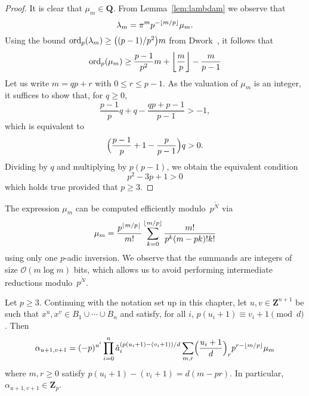 \begin{proof}
It is clear that $\mu_m \in \mathbf{Q}$.  From Lemma~\ref{lem:lambdam} 
we observe that 
\begin{equation*}
\lambda_m = \pi^m p^{- \left\lfloor m/p\right\rfloor} \mu_m.
\end{equation*}
Using the bound $\operatorname{ord}_p(\lambda_m) \geq \bigl((p-1)/p^2\bigr) m$ 
from Dwork~\citep[Pages~55--57]{Dwork62}, it follows that 
\begin{equation*}
\operatorname{ord}_p (\mu_m) \geq \frac{p-1}{p^2} m + \left\lfloor\frac{m}{p}\right\rfloor - \frac{m}{p-1}
\end{equation*}
Let us write $m = q p + r$ with $0 \leq r \leq p-1$.  As the valuation 
of $\mu_m$ is an integer, it suffices to show that, for $q \geq 0$, 
\begin{equation*}
\frac{p-1}{p} q + q - \frac{q p + p - 1}{p - 1} > -1,
\end{equation*}
which is equivalent to 
\begin{equation*}
\Bigl( \frac{p-1}{p} + 1 - \frac{p}{p - 1} \Bigr) q > 0.
\end{equation*}
Dividing by $q$ and multiplying by $p (p-1)$, we obtain the equivalent 
condition
\begin{equation*}
p^2 - 3p + 1 > 0
\end{equation*}
which holds true provided that $p \geq 3$.
\end{proof}

\begin{rem} \label{rem:01-03-mup}
The expression $\mu_m$ can be computed efficiently 
modulo~$p^{\tilde{N}}$ via
\begin{equation*}
\mu_m = \frac{p^{\left\lfloor m/p\right\rfloor}}{m!} 
    \sum_{k=0}^{\left\lfloor m/p\right\rfloor} \frac{m!}{p^k (m-pk)! k!}
\end{equation*}
using only one $p$-adic inversion.  We observe that the summands are 
integers of size $\mathcal{O}(m \log m)$ bits, which allows us to 
avoid performing intermediate reductions modulo~$p^{\tilde{N}}$.
\end{rem}

\begin{thm} \label{thm:alphap}
Let $p \geq 3$.  Continuing with the notation set up in this chapter, 
let $u, v \in \mathbf{Z}^{n+1}$ be such that 
$x^u, x^v \in B_1 \cup \dotsb \cup B_n$ and satisfy, 
for all $i$, $p (u_i + 1) \equiv v_i + 1 \pmod{d}$. 
Then 
\begin{equation} \label{eq:alphap.0}
\alpha_{u+1,v+1} = (-p)^{u'} \prod_{i=0}^n 
    \hat{a}_i^{(p (u_i + 1) - (v_i + 1))/d} \sum_{m,r} 
    \Bigl(\frac{u_i+1}{d}\Bigr)_r p^{r - \left\lfloor m/p\right\rfloor} \mu_m
\end{equation}
where $m, r \geq 0$ satisfy $p (u_i + 1) - (v_i + 1) = d (m - pr)$. 
In particular, $\alpha_{u+1, v+1} \in \mathbf{Z}_p$. 
\end{thm}

